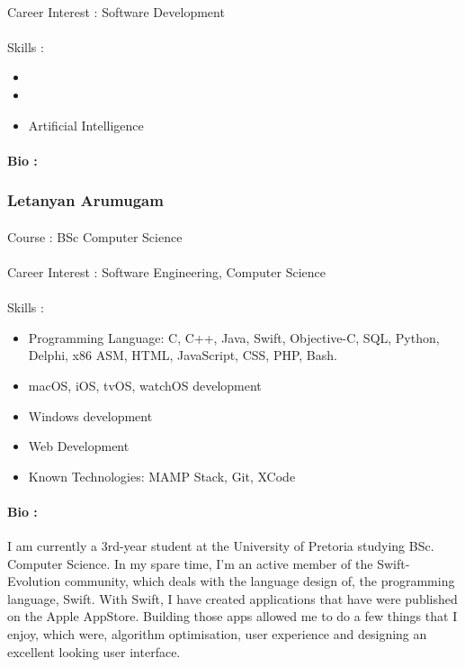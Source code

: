 \documentclass[11pt]{article}
\begin{document}
\paragraph{}Career Interest : Software Development
\paragraph{}Skills : 
\begin{itemize}
\item 
\item 
\item Artificial Intelligence
\end{itemize}
\paragraph{Bio :} 
\subsubsection{Letanyan Arumugam}
\paragraph{}Course : BSc Computer Science 
\paragraph{}Career Interest : Software Engineering, Computer Science
\paragraph{}Skills :
\begin{itemize}

\item Programming Language: C, C++, Java, Swift, Objective-C, SQL, Python, Delphi, x86 ASM, HTML, JavaScript, CSS, PHP, Bash.
\item macOS, iOS, tvOS, watchOS development
\item Windows development 
\item Web Development
\item Known Technologies: MAMP Stack, Git, XCode
\end{itemize}
\paragraph{Bio :}I am currently a 3rd-year student at the University of Pretoria studying BSc. Computer Science. In my spare time, I'm an active member of the Swift-Evolution community, which deals with the language design of, the programming language, Swift. With Swift, I have created applications that have were published on the Apple AppStore. Building those apps allowed me to do a few things that I enjoy, which were, algorithm optimisation, user experience and designing an excellent looking user interface.
\end{document}
